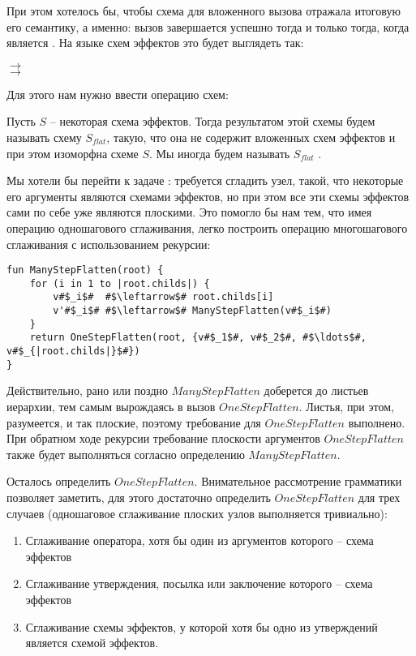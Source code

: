При этом хотелось бы, чтобы схема для вложенного вызова отражала итоговую его семантику, а именно: вызов завершается успешно тогда и только тогда, когда  является . На языке схем эффектов это будет выглядеть так:

{
     $\rightarrow$  \\
     $\rightarrow$ 
    
}{}

Для этого нам нужно ввести операцию  схем:

\begin{definition}
    Пусть $S$ -- некоторая схема эффектов. Тогда результатом  этой схемы будем называть схему $S_{flat}$, такую, что она не содержит вложенных схем эффектов и при этом изоморфна схеме $S$. Мы иногда будем называть $S_{flat}$ .
\end{definition}

Мы хотели бы перейти к задаче : требуется сгладить узел, такой, что некоторые его аргументы являются схемами эффектов, но при этом все эти схемы эффектов сами по себе уже являются плоскими. Это помогло бы нам тем, что имея операцию одношагового сглаживания, легко построить операцию многошагового сглаживания с использованием рекурсии:

\begin{verbatim}
fun ManyStepFlatten(root) {
    for (i in 1 to |root.childs|) {
        v#$_i$#  #$\leftarrow$# root.childs[i]
        v'#$_i$# #$\leftarrow$# ManyStepFlatten(v#$_i$#) 
    }
    return OneStepFlatten(root, {v#$_1$#, v#$_2$#, #$\ldots$#, v#$_{|root.childs|}$#})
}
\end{verbatim}

Действительно, рано или поздно $ManyStepFlatten$ доберется до листьев иерархии, тем самым вырождаясь в вызов $OneStepFlatten$. Листья, при этом, разумеется, и так плоские, поэтому требование для $OneStepFlatten$ выполнено. При обратном ходе рекурсии требование плоскости аргументов $OneStepFlatten$ также будет выполняться согласно определению $ManyStepFlatten$. 

Осталось определить $OneStepFlatten$. Внимательное рассмотрение грамматики позволяет заметить, для этого достаточно определить $OneStepFlatten$ для трех случаев (одношаговое сглаживание плоских узлов выполняется тривиально):

\begin{enumerate}   
    \item Сглаживание оператора, хотя бы один из аргументов которого -- схема эффектов
    
    \item Сглаживание утверждения, посылка или заключение которого -- схема эффектов
    
    \item Сглаживание схемы эффектов, у которой хотя бы одно из утверждений является схемой эффектов.
\end{enumerate}

